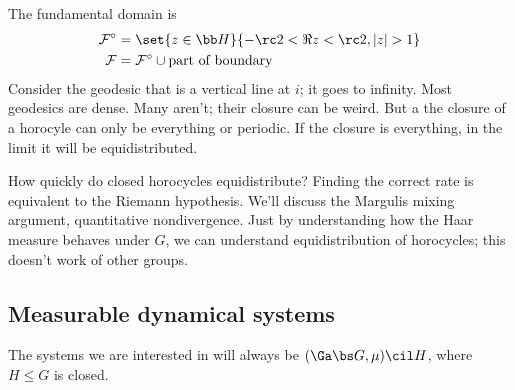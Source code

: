

The fundamental domain is
\begin{align}
\cal F^{\circ} &= \set{z\in \bb H}{-\rc 2<\Re z<\rc 2, |z|>1}\\
\cal F &= \cal F^{\circ} \cup \text{part of boundary}
\end{align}
Consider the geodesic that is a vertical line at $i$; it goes to infinity. Most geodesics are dense. Many aren't; their closure can be weird. %
But a the closure of a horocyle can only be everything or periodic. If the closure is everything, in the limit it will be equidistributed. 

How quickly do closed horocycles equidistribute?  Finding the correct rate is equivalent to the Riemann hypothesis. 
We'll discuss the 
Margulis mixing argument, quantitative nondivergence.
Just by understanding how the Haar measure behaves under $G$, we can understand equidistribution of horocycles; this doesn't work of other groups.

\subsection{Measurable dynamical systems}

The systems we are interested in will always be $(\Ga\bs G, \mu)\cil H$, where $H\le G$ is closed. 

